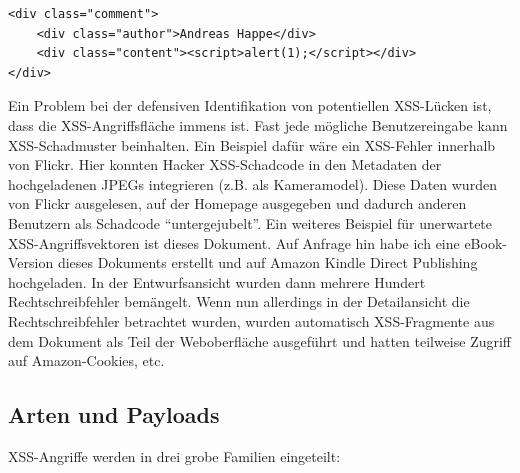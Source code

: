 \begin{verbatim}
<div class="comment">
	<div class="author">Andreas Happe</div>
	<div class="content"><script>alert(1);</script></div>
</div>
\end{verbatim}

Ein Problem bei der defensiven Identifikation von potentiellen XSS-Lücken ist, dass die XSS-Angriffsfläche immens ist. Fast jede mögliche Benutzereingabe kann XSS-Schadmuster beinhalten. Ein Beispiel dafür wäre ein XSS-Fehler innerhalb von Flickr. Hier konnten Hacker XSS-Schadcode in den Metadaten der hochgeladenen JPEGs integrieren (z.B. als Kameramodel). Diese Daten wurden von Flickr ausgelesen, auf der Homepage ausgegeben und dadurch anderen Benutzern als Schadcode ``untergejubelt''. Ein weiteres Beispiel für unerwartete XSS-Angriffsvektoren ist dieses Dokument. Auf Anfrage hin habe ich eine eBook-Version dieses Dokuments erstellt und auf Amazon Kindle Direct Publishing hochgeladen. In der Entwurfsansicht wurden dann mehrere Hundert Rechtschreibfehler bemängelt. Wenn nun allerdings in der Detailansicht die Rechtschreibfehler betrachtet wurden, wurden automatisch XSS-Fragmente aus dem Dokument als Teil der Weboberfläche ausgeführt und hatten teilweise Zugriff auf Amazon-Cookies, etc.

\subsection{Arten und Payloads}

XSS-Angriffe werden in drei grobe Familien eingeteilt:

